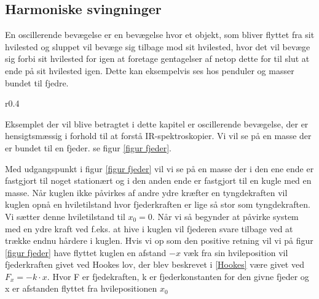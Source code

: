 \subsection{Harmoniske svingninger}\label{teori: Harmoniske svingninger}
En oscillerende bevægelse er en bevægelse hvor et objekt, som bliver flyttet fra sit hvilested og sluppet vil bevæge sig tilbage mod sit hvilested, hvor det vil bevæge sig forbi sit hvilested for igen at foretage gentagelser af netop dette for til slut at ende på sit hvilested igen. Dette kan eksempelvis ses hos penduler og masser bundet til fjedre.
\\

\begin{wrapfigure}{r}{0.4\textwidth}
\centering
{}
\caption{Fjeder der trækkes i}
\label{figur fjeder}
\end{wrapfigure} 

Eksemplet der vil blive betragtet i dette kapitel er oscillerende bevægelse, der er hensigtsmæssig i forhold til at forstå IR-spektroskopier. Vi vil se på en masse der er bundet til en fjeder. se figur \ref{figur fjeder}.

Med udgangspunkt i figur \ref{figur fjeder} vil vi se på en masse der i den ene ende er fastgjort til noget stationært og i den anden ende er fastgjort til en kugle med en masse. Når kuglen ikke påvirkes af andre ydre kræfter en tyngdekraften vil kuglen opnå en hviletilstand hvor fjederkraften er lige så stor som tyngdekraften. Vi sætter denne hviletilstand til $x_0=0$. Når vi så begynder at påvirke system med en ydre kraft ved f.eks. at hive i kuglen vil fjederen svare tilbage ved at trække endnu hårdere i kuglen. Hvis vi op som den positive retning vil vi på figur \ref{figur fjeder} have flyttet kuglen en afstand $-x$ væk fra sin hvileposition vil fjederkraften givet ved Hookes lov, der blev beskrevet i \ref{Hookes} være givet ved $F_x=-k \cdot x$. Hvor F er fjedekraften, k er fjederkonstanten for den givne fjeder og x er afstanden flyttet fra hvilepositionen $x_0$
